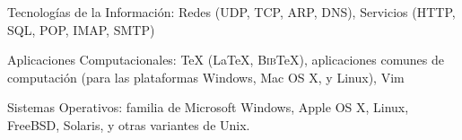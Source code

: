 \blankline

Tecnologías de la Información: Redes (UDP, TCP, ARP, DNS),
Servicios (HTTP, SQL, POP, IMAP, SMTP)

\blankline

Aplicaciones Computacionales: \TeX{} (\LaTeX{}, B\textsc{ib}\TeX{}),
        aplicaciones comunes de computación (para las plataformas Windows,
        Mac OS X, y Linux), Vim

\blankline

Sistemas Operativos: familia de Microsoft Windows, Apple OS X, Linux, FreeBSD,
        Solaris, y otras variantes de Unix.






